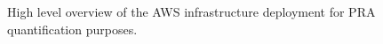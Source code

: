 \begin{figure}[H]
  \centering
  
  \caption{High level overview of the AWS infrastructure deployment for PRA quantification purposes.}
  \label{fig:aws}
\end{figure}